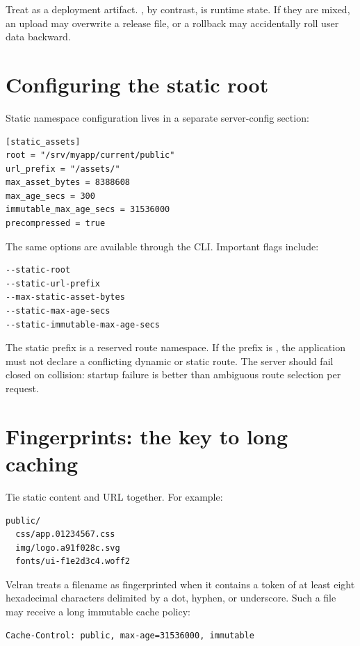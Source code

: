 Treat  as a deployment artifact. , by contrast, is runtime state. If they are mixed, an upload may overwrite a release file, or a rollback may accidentally roll user data backward.

\section{Configuring the static root}

Static namespace configuration lives in a separate server-config section:

\begin{lstlisting}
[static_assets]
root = "/srv/myapp/current/public"
url_prefix = "/assets/"
max_asset_bytes = 8388608
max_age_secs = 300
immutable_max_age_secs = 31536000
precompressed = true
\end{lstlisting}

The same options are available through the CLI. Important flags include:

\begin{lstlisting}
--static-root
--static-url-prefix
--max-static-asset-bytes
--static-max-age-secs
--static-immutable-max-age-secs
\end{lstlisting}

The static prefix is a reserved route namespace. If the prefix is , the application must not declare a conflicting dynamic or static route. The server should fail closed on collision: startup failure is better than ambiguous route selection per request.

\section{Fingerprints: the key to long caching}

Tie static content and URL together. For example:

\begin{lstlisting}
public/
  css/app.01234567.css
  img/logo.a91f028c.svg
  fonts/ui-f1e2d3c4.woff2
\end{lstlisting}

Velran treats a filename as fingerprinted when it contains a token of at least eight hexadecimal characters delimited by a dot, hyphen, or underscore. Such a file may receive a long immutable cache policy:

\begin{lstlisting}
Cache-Control: public, max-age=31536000, immutable
\end{lstlisting}


